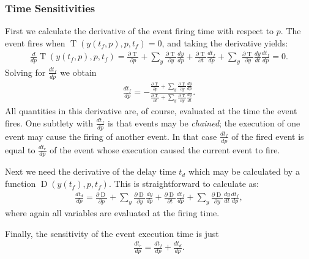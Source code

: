 \documentclass[12pt]{article}
\newcommand{\trigger}{\ensuremath{\operatorname{T}}\xspace}
\newcommand{\delay}{\ensuremath{\operatorname{D}}\xspace}
\begin{document}
\subsubsection{Time Sensitivities}
First we calculate the derivative of the event firing time with respect to $p$.
The event fires when $\trigger(y(t_f, p), p, t_f) = 0$, and taking the derivative yields:
\begin{align}
\frac{d}{dp}\trigger(y(t_f, p), p, t_f) =
   \frac{\partial \trigger}{\partial p} 
   + \sum_y \frac{\partial \trigger}{\partial y} \frac{dy}{dp} 
   + \frac{\partial \trigger}{\partial t} \frac{d t_f}{dp} 
   + \sum_y \frac{\partial \trigger}{\partial y} \frac{dy}{dt}\frac{d t_f}{dp}
= 0.
\end{align}
Solving for $\frac{d t_f}{dp}$ we obtain
\begin{align}
\frac{d t_f}{dp} = -
\frac{
    \frac{\partial \trigger}{\partial p} 
    + \sum_y \frac{\partial \trigger}{\partial y} \frac{dy}{dp}
}{
    \frac{\partial \trigger}{\partial t} 
    + \sum_y \frac{\partial \trigger}{\partial y} \frac{dy}{dt}
}.
\end{align}
All quantities in this derivative are, of course, evaluated at the time the
event fires.
One subtlety with $\frac{d t_f}{dp}$ is that events may be \emph{chained}; the execution of one event may cause the firing of another event.
In that case $\frac{d t_f}{dp}$ of the fired event is equal to $\frac{d t_e}{dp}$ of the event whose execution caused the current event to fire.

Next we need the derivative of the delay time $t_d$ which may be calculated by a function $\delay(y(t_f), p, t_f)$. This is straightforward to calculate as:
\begin{align}
\frac{d t_d}{dp} = 
\frac{\partial \delay}{\partial p} 
+ \sum_y \frac{\partial \delay}{\partial y} \frac{dy}{dp} 
+ \frac{\partial \delay}{\partial t} \frac{d t_f}{dp} 
+ \sum_y \frac{\partial \delay}{\partial y} \frac{dy}{dt}\frac{d t_f}{dp},
\end{align}
where again all variables are evaluated at the firing time.

Finally, the sensitivity of the event execution time is just
\begin{align}
\frac{d t_e}{dp} = \frac{d t_f}{dp} + \frac{d t_d}{dp}.
\end{align}
\end{document}

